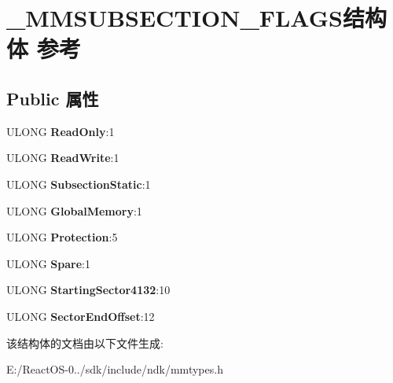 \hypertarget{struct___m_m_s_u_b_s_e_c_t_i_o_n___f_l_a_g_s}{}\section{\+\_\+\+M\+M\+S\+U\+B\+S\+E\+C\+T\+I\+O\+N\+\_\+\+F\+L\+A\+G\+S结构体 参考}
\label{struct___m_m_s_u_b_s_e_c_t_i_o_n___f_l_a_g_s}
\subsection*{Public 属性}
\begin{DoxyCompactItemize}
\item 
\mbox{\label{struct___m_m_s_u_b_s_e_c_t_i_o_n___f_l_a_g_s_a6d0e04313b4fb93f78b5999f1be353a5}} 
U\+L\+O\+NG {\bfseries Read\+Only}\+:1
\item 
\mbox{\label{struct___m_m_s_u_b_s_e_c_t_i_o_n___f_l_a_g_s_ab9ac7978e0056731205385830d11fed7}} 
U\+L\+O\+NG {\bfseries Read\+Write}\+:1
\item 
\mbox{\label{struct___m_m_s_u_b_s_e_c_t_i_o_n___f_l_a_g_s_a8c773a0506d647a1bece83eada8b5361}} 
U\+L\+O\+NG {\bfseries Subsection\+Static}\+:1
\item 
\mbox{\label{struct___m_m_s_u_b_s_e_c_t_i_o_n___f_l_a_g_s_ac469bba1f8f03d5d44d39951bfeb501c}} 
U\+L\+O\+NG {\bfseries Global\+Memory}\+:1
\item 
\mbox{\label{struct___m_m_s_u_b_s_e_c_t_i_o_n___f_l_a_g_s_a8214f0468f02d3581d896bf435e005c9}} 
U\+L\+O\+NG {\bfseries Protection}\+:5
\item 
\mbox{\label{struct___m_m_s_u_b_s_e_c_t_i_o_n___f_l_a_g_s_a7caa5b5a5251c164bb72f0e0bb384514}} 
U\+L\+O\+NG {\bfseries Spare}\+:1
\item 
\mbox{\label{struct___m_m_s_u_b_s_e_c_t_i_o_n___f_l_a_g_s_a210c26b322038d66657e4eab60a06a49}} 
U\+L\+O\+NG {\bfseries Starting\+Sector4132}\+:10
\item 
\mbox{\label{struct___m_m_s_u_b_s_e_c_t_i_o_n___f_l_a_g_s_aa996e0d1837381bad759a3e240784f1b}} 
U\+L\+O\+NG {\bfseries Sector\+End\+Offset}\+:12
\end{DoxyCompactItemize}


该结构体的文档由以下文件生成\+:\begin{DoxyCompactItemize}
\item 
E\+:/\+React\+O\+S-\/0../sdk/include/ndk/mmtypes.\+h\end{DoxyCompactItemize}
